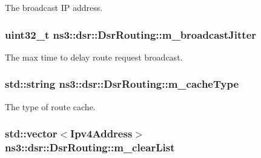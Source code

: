The broadcast IP address. 

\subsubsection[{\texorpdfstring{m\+\_\+broadcast\+Jitter}{m_broadcastJitter}}]{\setlength{\rightskip}{0pt plus 5cm}uint32\+\_\+t ns3\+::dsr\+::\+Dsr\+Routing\+::m\+\_\+broadcast\+Jitter\hspace{0.3cm}{\ttfamily [private]}}\hypertarget{classns3_1_1dsr_1_1DsrRouting_afb77e13fc791e5076ee1f8595b9c6617}{}\label{classns3_1_1dsr_1_1DsrRouting_afb77e13fc791e5076ee1f8595b9c6617}


The max time to delay route request broadcast. 

\subsubsection[{\texorpdfstring{m\+\_\+cache\+Type}{m_cacheType}}]{\setlength{\rightskip}{0pt plus 5cm}std\+::string ns3\+::dsr\+::\+Dsr\+Routing\+::m\+\_\+cache\+Type\hspace{0.3cm}{\ttfamily [private]}}\hypertarget{classns3_1_1dsr_1_1DsrRouting_a07e25fa5f4aebf7b129a31853988045b}{}\label{classns3_1_1dsr_1_1DsrRouting_a07e25fa5f4aebf7b129a31853988045b}


The type of route cache. 

\subsubsection[{\texorpdfstring{m\+\_\+clear\+List}{m_clearList}}]{\setlength{\rightskip}{0pt plus 5cm}std\+::vector$<${\bf Ipv4\+Address}$>$ ns3\+::dsr\+::\+Dsr\+Routing\+::m\+\_\+clear\+List\hspace{0.3cm}{\ttfamily [private]}}\hypertarget{classns3_1_1dsr_1_1DsrRouting_add76dd26d3fd2721ab9be4520daa477f}{}\label{classns3_1_1dsr_1_1DsrRouting_add76dd26d3fd2721ab9be4520daa477f}


